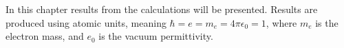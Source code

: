 In this chapter results from the calculations will be presented. Results are produced using atomic units, meaning $\hbar = e = m_e = 4\pi \epsilon_0 = 1$, where $m_e$ is the electron mass, and $e_0$ is the vacuum permittivity. 
